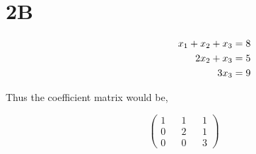 \documentclass{article}
\begin{document}

\section*{2B}

\setcounter{equation}{0}

\begin{align}
    \hspace*{1.0in}
    x_1 + x_2 + x_3 &= 8& \\
    2x_2 + x_3 &= 5& \\
    3x_3 &= 9&
\end{align}

\raggedright Thus the coefficient matrix would be,

\[
\begin{pmatrix}
    1 && 1 && 1 \\
    0 && 2 && 1 \\
    0 && 0 && 3
\end{pmatrix}
\]
\end{document}
